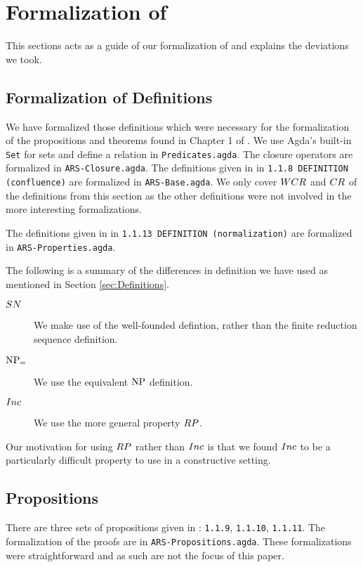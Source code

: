 \section{Formalization of \terese}
\label{sec:Formalization}
This sections acts as a guide of our formalization of \terese and explains the deviations we took.  

\subsection{Formalization of Definitions}
We have formalized those definitions which were necessary for the formalization of the propositions and theorems found 
in Chapter 1 of \terese. We use Agda's built-in \texttt{Set} for sets and define a relation in \texttt{Predicates.agda}.
The closure operators are formalized in \texttt{ARS-Closure.agda}. 
The definitions given in \terese in \texttt{1.1.8 DEFINITION (confluence)} 
are formalized in \texttt{ARS-Base.agda}. We only cover $\WCR$ and $\CR$ of the definitions from this section 
as the other definitions were not involved in the more interesting formalizations.

The definitions given in \terese in \texttt{1.1.13 DEFINITION (normalization)} 
are formalized in \texttt{ARS-Properties.agda}.  


The following is a summary of the differences in definition we have used as mentioned in Section \ref{sec:Definitions}. 
\begin{description}
    \item[$\SN$] We make use of the well-founded defintion, rather than the finite reduction sequence definition.
    \item[$\mathrm{NP_=}$] We use the equivalent $\mathrm{NP}$ definition. 
    \item[$\Inc$] We use the more general property $\RP$.      
\end{description}

Our motivation for using $\RP$ rather than $\Inc$ is that we found $\Inc$ to be a particularly difficult property 
to use in a constructive setting. 

\subsection{Propositions}
There are three sets of propositions given in \terese: \texttt{1.1.9}, \texttt{1.1.10}, \texttt{1.1.11}. 
The formalization of the proofs are in \texttt{ARS-Propositions.agda}. These formalizations were straightforward 
and as such are not the focus of this paper. 

